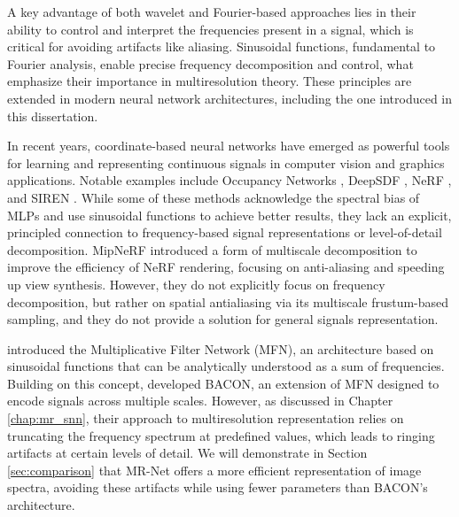 A key advantage of both wavelet and Fourier-based approaches lies in their ability to control and interpret the frequencies present in a signal, which is critical for avoiding artifacts like aliasing. Sinusoidal functions, fundamental to Fourier analysis, enable precise frequency decomposition and control, what emphasize their importance in multiresolution theory. These principles are extended in modern neural network architectures, including the one introduced in this dissertation.

In recent years, coordinate-based neural networks have emerged as powerful tools for learning and representing continuous signals in computer vision and graphics applications. Notable examples include Occupancy Networks \citep{occupancy_networks}, DeepSDF \citep{park2019deepsdf}, NeRF \citep{2020nerf}, and SIREN \citep{sitzmann2019siren}. While some of these methods acknowledge the spectral bias of MLPs and use sinusoidal functions to achieve better results, they lack an explicit, principled connection to frequency-based signal representations or level-of-detail decomposition. MipNeRF \citep{barron2022mipnerf360} introduced a form of multiscale decomposition to improve the efficiency of NeRF rendering, focusing on anti-aliasing and speeding up view synthesis. However, they do not explicitly focus on frequency decomposition, but rather on spatial antialiasing via its multiscale frustum-based sampling, and they do not provide a solution for general signals representation.


\citet{fathony2020multiplicative} introduced the Multiplicative Filter Network (MFN), an architecture based on sinusoidal functions that can be analytically understood as a sum of frequencies. Building on this concept, \citet{bacon2021} developed BACON, an extension of MFN designed to encode signals across multiple scales. However, as discussed in Chapter \ref{chap:mr_snn}, their approach to multiresolution representation relies on truncating the frequency spectrum at predefined values, which leads to ringing artifacts at certain levels of detail. We will demonstrate in Section \ref{sec:comparison} that MR-Net offers a more efficient representation of image spectra, avoiding these artifacts while using fewer parameters than BACON's architecture.


